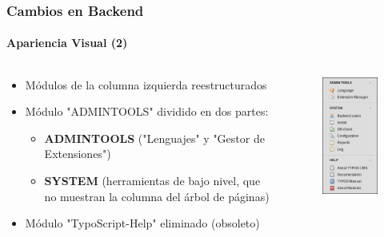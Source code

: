 
\begin{frame}[fragile]
	\frametitle{Cambios en Backend}
	\framesubtitle{Apariencia Visual (2)}

	\begin{columns}[T]

		\begin{column}{.5\textwidth}

			\begin{itemize}
				\item Módulos de la columna izquierda reestructurados
				\item Módulo "ADMINTOOLS" dividido en dos partes:

					\begin{itemize}
						\item \textbf{ADMINTOOLS} ("Lenguajes" y "Gestor de Extensiones")
						\item \textbf{SYSTEM} (herramientas de bajo nivel, que no muestran la columna del árbol de páginas)
					\end{itemize}

				\item Módulo "TypoScript-Help" eliminado (obsoleto)

			\end{itemize}

		\end{column}

		\begin{column}{.5\textwidth}
			\begin{figure}\vspace*{-0.4cm}
				\includegraphics[width=0.35\linewidth]{Images/BackendChanges/AdminTools.png}
			\end{figure}
		\end{column}

	\end{columns}

\end{frame}

